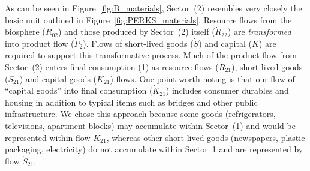 As can be seen in Figure~\ref{fig:B_materials}, 
Sector~(2) resembles very closely the basic unit
outlined in Figure~\ref{fig:PERKS_materials}. 
Resource flows from the biosphere ($\dot{R}_{02}$)
and those produced by Sector~(2) itself ($\dot{R}_{22}$) 
are \emph{transformed} into product flow
($\dot{P}_{2}$). 
Flows of short-lived goods ($\dot{S}$) 
and capital ($\dot{K}$) are required to
support this transformative process. 
Much of the product flow from Sector~(2) 
enters final consumption (1) as 
resource flows ($\dot{R}_{21}$), 
short-lived goods ($\dot{S}_{21}$) 
and capital goods ($\dot{K}_{21}$)
flows.
%
% 
%
%
One point worth noting is that 
our flow of 
``capital goods''
into final consumption ($\dot{K}_{21}$) 
includes consumer durables and housing
in addition to typical items 
such as bridges and other public infrastructure.
We chose this approach because some goods 
(refrigerators, televisions, apartment blocks) 
may accumulate within Sector~(1)
and would be represented within flow 
$\dot{K}_{21}$, 
whereas other short-lived goods
(newspapers, plastic packaging, electricity) 
do not accumulate within Sector~1 and are represented by flow 
$\dot{S}_{21}$.


